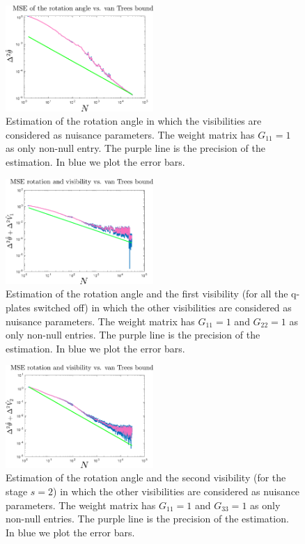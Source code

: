 \documentclass[aps, pra, 10pt, twocolumn, superscriptaddress,floatfix]{revtex4-1}
\begin{document}
%
\begin{figure}[!th]
	\begin{center}
		\includegraphics[width=0.5\textwidth]{theta.pdf}
	\end{center}
	\caption{Estimation of the rotation angle in which the visibilities are considered as nuisance parameters. The weight matrix has $G_{11} = 1$ as only non-null entry. The purple line is the precision of the estimation. In blue we plot the error bars.}
	\label{fig:theta}
\end{figure}
%
\begin{figure}[!t]
	\begin{center}
		\includegraphics[width=0.5\textwidth]{thetaV1.pdf}
	\end{center}
	\caption{Estimation of the rotation angle and the first visibility (for all the q-plates switched off) in which the other visibilities are considered as nuisance parameters. The weight matrix has $G_{11} = 1$ and $G_{22} = 1$ as only non-null entries. The purple line is the precision of the estimation. In blue we plot the error bars.}
	\label{fig:thetaV1}
\end{figure}
%
\begin{figure}[!t]
	\begin{center}
		\includegraphics[width=0.5\textwidth]{thetaV2.pdf}
	\end{center}
	\caption{Estimation of the rotation angle and the second visibility (for the stage $s=2$) in which the other visibilities are considered as nuisance parameters. The weight matrix has $G_{11} = 1$ and $G_{33} = 1$ as only non-null entries. The purple line is the precision of the estimation. In blue we plot the error bars.}
	\label{fig:thetaV2}
\end{figure}
\end{document}
